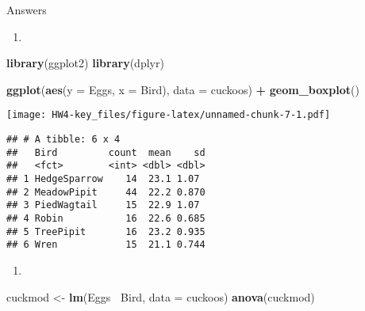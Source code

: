 \documentclass[]{article}
\newenvironment{Shaded}{\begin{snugshade}}{\end{snugshade}}
\newcommand{\KeywordTok}[1]{\textcolor[rgb]{0.13,0.29,0.53}{\textbf{#1}}}
\newcommand{\DataTypeTok}[1]{\textcolor[rgb]{0.13,0.29,0.53}{#1}}
\newcommand{\StringTok}[1]{\textcolor[rgb]{0.31,0.60,0.02}{#1}}
\newcommand{\OtherTok}[1]{\textcolor[rgb]{0.56,0.35,0.01}{#1}}
\newcommand{\OperatorTok}[1]{\textcolor[rgb]{0.81,0.36,0.00}{\textbf{#1}}}
\newcommand{\NormalTok}[1]{#1}
\begin{document}
Answers

\begin{enumerate}
\def\labelenumi{\alph{enumi}.}
\item
\end{enumerate}

\begin{Shaded}
\begin{Highlighting}[]
\KeywordTok{library}\NormalTok{(ggplot2)}
\KeywordTok{library}\NormalTok{(dplyr)}

\KeywordTok{ggplot}\NormalTok{(}\KeywordTok{aes}\NormalTok{(}\DataTypeTok{y =}\NormalTok{ Eggs, }\DataTypeTok{x =}\NormalTok{ Bird), }\DataTypeTok{data =}\NormalTok{ cuckoos) }\OperatorTok{+}\StringTok{ }\KeywordTok{geom_boxplot}\NormalTok{()}
\end{Highlighting}
\end{Shaded}

\texttt{[image: HW4-key\_files/figure-latex/unnamed-chunk-7-1.pdf]}

\begin{Shaded}
\end{Shaded}

\begin{verbatim}
## # A tibble: 6 x 4
##   Bird         count  mean    sd
##   <fct>        <int> <dbl> <dbl>
## 1 HedgeSparrow    14  23.1 1.07 
## 2 MeadowPipit     44  22.2 0.870
## 3 PiedWagtail     15  22.9 1.07 
## 4 Robin           16  22.6 0.685
## 5 TreePipit       16  23.2 0.935
## 6 Wren            15  21.1 0.744
\end{verbatim}

\begin{enumerate}
\def\labelenumi{\alph{enumi}.}
\setcounter{enumi}{1}
\item
\end{enumerate}

\begin{Shaded}
\begin{Highlighting}[]
\NormalTok{cuckmod <-}\StringTok{ }\KeywordTok{lm}\NormalTok{(Eggs }\OperatorTok{~}\NormalTok{Bird, }\DataTypeTok{data =}\NormalTok{ cuckoos)}
\KeywordTok{anova}\NormalTok{(cuckmod)}
\end{Highlighting}
\end{Shaded}
\end{document}

